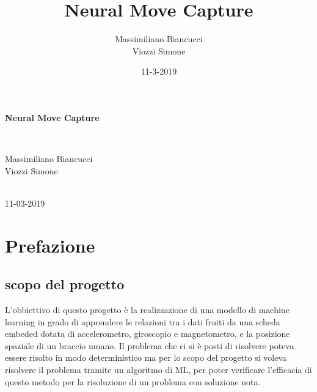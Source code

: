 \documentclass[10pt,a4paper]{article}
\title{Neural Move Capture}
\author{Massimiliano Biancucci\\Viozzi Simone}
\date{11-3-2019}
\begin{document}
\begin{titlepage}
    \vspace*{\fill}
    \begin{center}
      {\begin{huge} \textbf{Neural Move Capture}\end{huge}}\\[0.5cm]
      {\begin{large} Massimiliano Biancucci\\Viozzi Simone\end{large} }\\[0.4cm]
      11-03-2019
    \end{center}
    \vspace*{\fill}
  \end{titlepage}


\tableofcontents
{}

\newpage

\setcounter{page}{3}

\section{Prefazione}
 
\subsection{scopo del progetto}
L'obbiettivo di questo progetto \`e la realizzazione di una modello di machine learning in grado di apprendere le relazioni tra i dati fruiti da una scheda embeded dotata di accelerometro, giroscopio e magnetometro, e la posizione spaziale di un braccio umano.
Il problema che ci si \`e posti di risolvere poteva essere risolto in modo deterministico ma per lo scopo del progetto si voleva risolvere il problema tramite un algoritmo di ML, per poter verificare l'efficacia di questo metodo per la risoluzione di un problema con soluzione nota.
\end{document}
